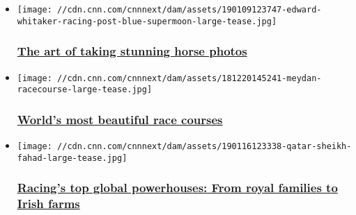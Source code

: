 \begin{itemize}
\item
  \href{/2019/01/17/sport/edward-whitaker-racing-post-photographer-horse-racing-spt-intl/index.html}{}

  \texttt{[image: //cdn.cnn.com/cnnnext/dam/assets/190109123747-edward-whitaker-racing-post-blue-supermoon-large-tease.jpg]}

  \hypertarget{the-art-of-taking-stunning-horse-photos}{%
  \subsubsection{\texorpdfstring{\href{/2019/01/17/sport/edward-whitaker-racing-post-photographer-horse-racing-spt-intl/index.html}{The
  art of taking stunning horse
  photos}}{The art of taking stunning horse photos}}\label{the-art-of-taking-stunning-horse-photos}}
\end{itemize}

\begin{itemize}
\item
  \href{/2019/01/08/sport/beautiful-horse-racecourses-spt-intl/index.html}{}

  \texttt{[image: //cdn.cnn.com/cnnnext/dam/assets/181220145241-meydan-racecourse-large-tease.jpg]}

  \hypertarget{worlds-most-beautiful-race-courses}{%
  \subsubsection{\texorpdfstring{\href{/2019/01/08/sport/beautiful-horse-racecourses-spt-intl/index.html}{World's
  most beautiful race
  courses}}{World's most beautiful race courses}}\label{worlds-most-beautiful-race-courses}}
\end{itemize}

\begin{itemize}
\item
  \href{/2019/01/24/sport/powerhouses-horse-racing-godolphin-coolmore-qatar-juddmonte-winstar-winning-post-spt-intl/index.html}{}

  \texttt{[image: //cdn.cnn.com/cnnnext/dam/assets/190116123338-qatar-sheikh-fahad-large-tease.jpg]}

  \hypertarget{racings-top-global-powerhouses-from-royal-families-to-irish-farms}{%
  \subsubsection{\texorpdfstring{\href{/2019/01/24/sport/powerhouses-horse-racing-godolphin-coolmore-qatar-juddmonte-winstar-winning-post-spt-intl/index.html}{Racing's
  top global powerhouses: From royal families to Irish
  farms}}{Racing's top global powerhouses: From royal families to Irish farms}}\label{racings-top-global-powerhouses-from-royal-families-to-irish-farms}}
\end{itemize}

